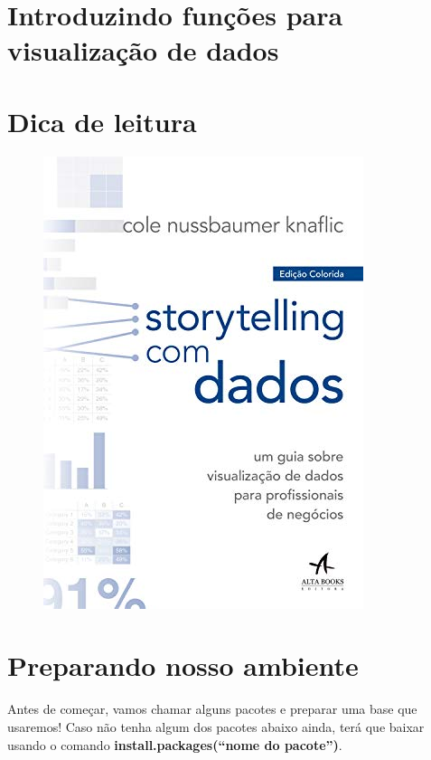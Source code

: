 \documentclass[
]{article}
\newenvironment{Shaded}{\begin{snugshade}}{\end{snugshade}}
\newcommand{\DecValTok}[1]{\textcolor[rgb]{0.00,0.00,0.81}{#1}}
\newcommand{\KeywordTok}[1]{\textcolor[rgb]{0.13,0.29,0.53}{\textbf{#1}}}
\newcommand{\NormalTok}[1]{#1}
\newcommand{\OperatorTok}[1]{\textcolor[rgb]{0.81,0.36,0.00}{\textbf{#1}}}
\newcommand{\StringTok}[1]{\textcolor[rgb]{0.31,0.60,0.02}{#1}}
\begin{document}
\hypertarget{introduzindo-funuxe7uxf5es-para-visualizauxe7uxe3o-de-dados}{%
\section{Introduzindo funções para visualização de
dados}\label{introduzindo-funuxe7uxf5es-para-visualizauxe7uxe3o-de-dados}}

\hypertarget{dica-de-leitura}{%
\section{Dica de leitura}\label{dica-de-leitura}}

\begin{figure}

{\centering \includegraphics[width=0.4\linewidth,height=0.3\textheight]{imagem/storytelling} 

}

\caption{ }\label{fig:livro, figures-side}
\end{figure}

\hypertarget{preparando-nosso-ambiente}{%
\section{Preparando nosso ambiente}\label{preparando-nosso-ambiente}}

Antes de começar, vamos chamar alguns pacotes e preparar uma base que
usaremos! Caso não tenha algum dos pacotes abaixo ainda, terá que baixar
usando o comando \textbf{install.packages(``nome do pacote'')}.

\begin{Shaded}
\end{Shaded}
\end{document}
